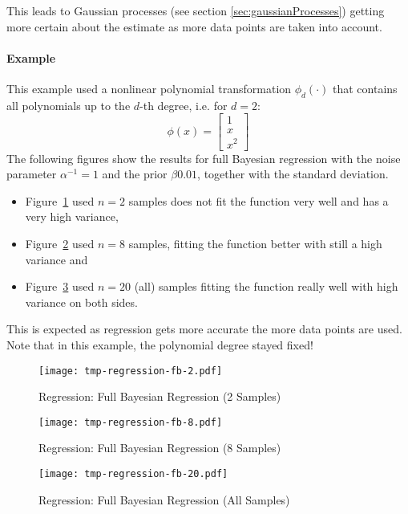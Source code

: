 				This leads to Gaussian processes (see section \ref{sec:gaussianProcesses}) getting more certain about the estimate as more data points are taken into account.

			\paragraph{Example}
				This example used a nonlinear polynomial transformation \( \phi_d(\cdot) \) that contains all polynomials up to the \(d\)-th degree, i.e. for \( d = 2 \):
				\begin{equation}
					\phi(x) =
							\begin{bmatrix}
							1 \\
							x \\
							x^2
						\end{bmatrix}
				\end{equation}
				The following figures show the results for full Bayesian regression with the noise parameter \( \alpha^{-1} = 1 \) and the prior \( \beta 0.01 \), together with the standard deviation.
				\begin{itemize}
					\item Figure~\ref{fig:regressionFb2} used \( n = 2 \) samples does not fit the function very well and has a very high variance,
					\item Figure~\ref{fig:regressionFb8} used \( n = 8 \) samples, fitting the function better with still a high variance and
					\item Figure~\ref{fig:regressionFb20} used \( n = 20 \) (all) samples fitting the function really well with high variance on both sides.
				\end{itemize}
				This is expected as regression gets more accurate the more data points are used. Note that in this example, the polynomial degree stayed fixed!
				
				\begin{figure}
					\centering
					\texttt{[image: tmp-regression-fb-2.pdf]}
					\caption{Regression: Full Bayesian Regression (2 Samples)}
					\label{fig:regressionFb2}
				\end{figure}
				\begin{figure}
					\centering
					\texttt{[image: tmp-regression-fb-8.pdf]}
					\caption{Regression: Full Bayesian Regression (8 Samples)}
					\label{fig:regressionFb8}
				\end{figure}
				\begin{figure}
					\centering
					\texttt{[image: tmp-regression-fb-20.pdf]}
					\caption{Regression: Full Bayesian Regression (All Samples)}
					\label{fig:regressionFb20}
				\end{figure}

